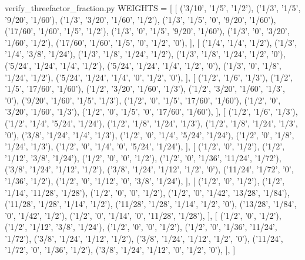 \begin{filecontents*}[overwrite]{verify_threefactor_fraction.py}
WEIGHTS = [
    [
        ('3/10', '1/5', '1/2'),
        ('1/3', '1/5', '9/20', '1/60'),
        ('1/3', '3/20', '1/60', '1/2'),
        ('1/3', '1/5', '0', '9/20', '1/60'),
        ('17/60', '1/60', '1/5', '1/2'),
        ('1/3', '0', '1/5', '9/20', '1/60'),
        ('1/3', '0', '3/20', '1/60', '1/2'),
        ('17/60', '1/60', '1/5', '0', '1/2', '0'),
    ],
    [
        ('1/4', '1/4', '1/2'),
        ('1/3', '1/4', '3/8', '1/24'),
        ('1/3', '1/8', '1/24', '1/2'),
        ('1/3', '1/8', '1/24', '1/2', '0'),
        ('5/24', '1/24', '1/4', '1/2'),
        ('5/24', '1/24', '1/4', '1/2', '0'),
        ('1/3', '0', '1/8', '1/24', '1/2'),
        ('5/24', '1/24', '1/4', '0', '1/2', '0'),
    ],
    [
        ('1/2', '1/6', '1/3'),
        ('1/2', '1/5', '17/60', '1/60'),
        ('1/2', '3/20', '1/60', '1/3'),
        ('1/2', '3/20', '1/60', '1/3', '0'),
        ('9/20', '1/60', '1/5', '1/3'),
        ('1/2', '0', '1/5', '17/60', '1/60'),
        ('1/2', '0', '3/20', '1/60', '1/3'),
        ('1/2', '0', '1/5', '0', '17/60', '1/60'),
    ],
    [
        ('1/2', '1/6', '1/3'),
        ('1/2', '1/4', '5/24', '1/24'),
        ('1/2', '1/8', '1/24', '1/3'),
        ('1/2', '1/8', '1/24', '1/3', '0'),
        ('3/8', '1/24', '1/4', '1/3'),
        ('1/2', '0', '1/4', '5/24', '1/24'),
        ('1/2', '0', '1/8', '1/24', '1/3'),
        ('1/2', '0', '1/4', '0', '5/24', '1/24'),
    ],
    [
        ('1/2', '0', '1/2'),
        ('1/2', '1/12', '3/8', '1/24'),
        ('1/2', '0', '0', '1/2'),
        ('1/2', '0', '1/36', '11/24', '1/72'),
        ('3/8', '1/24', '1/12', '1/2'),
        ('3/8', '1/24', '1/12', '1/2', '0'),
        ('11/24', '1/72', '0', '1/36', '1/2'),
        ('1/2', '0', '1/12', '0', '3/8', '1/24'),
    ],
    [
        ('1/2', '0', '1/2'),
        ('1/2', '1/14', '11/28', '1/28'),
        ('1/2', '0', '0', '1/2'),
        ('1/2', '0', '1/42', '13/28', '1/84'),
        ('11/28', '1/28', '1/14', '1/2'),
        ('11/28', '1/28', '1/14', '1/2', '0'),
        ('13/28', '1/84', '0', '1/42', '1/2'),
        ('1/2', '0', '1/14', '0', '11/28', '1/28'),
    ],
    [
        ('1/2', '0', '1/2'),
        ('1/2', '1/12', '3/8', '1/24'),
        ('1/2', '0', '0', '1/2'),
        ('1/2', '0', '1/36', '11/24', '1/72'),
        ('3/8', '1/24', '1/12', '1/2'),
        ('3/8', '1/24', '1/12', '1/2', '0'),
        ('11/24', '1/72', '0', '1/36', '1/2'),
        ('3/8', '1/24', '1/12', '0', '1/2', '0'),
    ],
]


\end{filecontents*}
